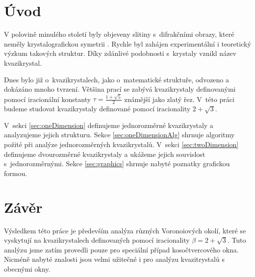 \documentclass[a4paper,11pt,twoside]{article}
\theoremstyle{definition}
\theoremstyle{remark}
\begin{document}

\clearpage
\thispagestyle{empty}
\cleardoublepage
\thispagestyle{empty}

\tableofcontents

\clearpage

\section*{Úvod}
V polovině minulého století byly objeveny slitiny s~difrakčními obrazy, které neměly krystalografickou symetrii \cite{metallic}. Rychle byl zahájen experimentální i teoretický výzkum takových struktur. Díky zdánlivé podobnosti s~krystaly vznikl název kvazikrystal.

Dnes bylo již o~kvazikrystalech, jako o~matematické struktuře, odvozeno a dokázáno mnoho tvrzení. Většina prací se zabývá kvazikrystaly definovanými pomocí iracionální konstanty $\tau = \frac{1+\sqrt{5}}{2}$ známější jako zlatý řez. V~této práci budeme studovat kvazikrystaly definované pomocí iracionality $2+\sqrt{3}$.

V~sekci \ref{sec:oneDimension} definujeme jednorozměrné kvazikrystaly a analyzujeme jejich strukturu. Sekce \ref{sec:oneDimensionAlg} shrnuje algoritmy požité při analýze jednorozměrných kvazikrystalů. V~sekci \ref{sec:twoDimension} definujeme dvourozměrné kvazikrystaly a ukážeme jejich souvislost s~jednorozměrnými. Sekce \ref{sec:graphics} shrnuje nabyté poznatky grafickou formou.

%
%
%
%

%

\newpage
\restoregeometry
\section*{Závěr}
Výsledkem této práce je především analýza různých Voronoiových okolí, které se vyskytují na kvazikrystalech definovaných pomocí iracionality $\beta = 2+\sqrt{3}$. Tuto analýzu jsme zatím provedli pouze pro speciální případ kosočtvercového okna. Nicméně nabyté znalosti jsou velmi užitečné i pro analýzu kvazitrystalů s obecnými okny. 
\end{document}
